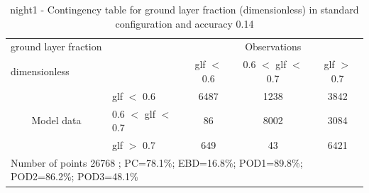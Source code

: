 \begin{table}[p!]
\begin{center}
\begin{tabular}{llccc}
\hline
{ground layer fraction}                                       &                                                    & \multicolumn{3}{c}{Observations}                 \\
{dimensionless}                                       &                             & glf $<$ 0.6   & 0.6 $<$ glf $<$ 0.7 & glf $>$ 0.7 \\
\hline
\multicolumn{1}{c}{\multirow{3}{*}{Model data}}  & glf $<$ 0.6             & 6487                & 1238                       & 3842              \\
                                                 & 0.6  $<$ glf $<$ 0.7 & 86                & 8002                       & 3084              \\
                                                 & glf $>$ 0.7             & 649                & 43                       & 6421              \\
\hline
\multicolumn{5}{l}{ Number of points        26768 ; PC=78.1\%; EBD=16.8\%; POD1=89.8\%; POD2=86.2\%; POD3=48.1\%}
\end{tabular}
\end{center}
\caption{night1 - Contingency table for  ground layer fraction (dimensionless) in standard configuration and accuracy 0.14}
\label{tab:contingencyglfBEF:night1}
\end{table}
